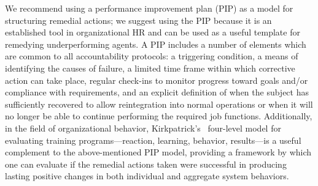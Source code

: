 We recommend using a performance improvement plan (PIP) as a model for
structuring remedial actions; we suggest using the PIP because it is an
established tool in organizational HR and can be used as a useful template for
remedying underperforming agents. A PIP includes a number of elements which are
common to all accountability protocols: a triggering condition, a means of
identifying the causes of failure, a limited time frame within which corrective
action can take place, regular check-ins to monitor progress toward goals and/or
compliance with requirements, and an explicit definition of when the subject has
sufficiently recovered to allow reintegration into normal operations or when it
will no longer be able to continue performing the required job functions.
Additionally, in the field of organizational behavior, Kirkpatrick's~\cite{kirkpatrick1994evaluating}
four-level model for evaluating training programs---reaction, learning,
behavior, results---is a useful complement to the above-mentioned PIP model,
providing a framework by which one can evaluate if the remedial actions taken
were successful in producing lasting positive changes in both individual and
aggregate system behaviors.

